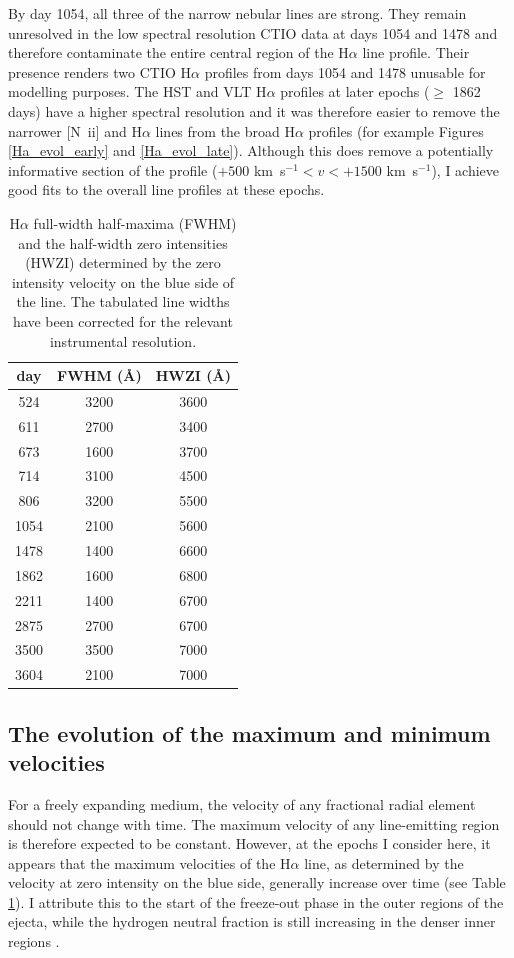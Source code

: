  
By day 1054, all three of the narrow nebular lines are strong.  They 
remain unresolved in the low spectral resolution CTIO data at days 1054 
and 1478 and therefore contaminate the entire central region of the 
H$\alpha$ line profile.  Their presence renders two CTIO H$\alpha$ 
profiles from days 1054 and 1478 unusable for modelling purposes.  The HST 
and VLT H$\alpha$ profiles at later epochs ($\ge$ 1862 days) have a higher 
spectral resolution and it was therefore easier to remove the narrower 
[N~{\sc ii}] and H$\alpha$ lines from the broad H$\alpha$ profiles (for 
example Figures \ref{Ha_evol_early} and \ref{Ha_evol_late}). Although this 
does remove a potentially informative section of the profile ($+500$ 
km~s$^{-1}<v<+1500$ km~s$^{-1}$), I achieve good fits to the overall line 
profiles at these epochs.

\begin{table}
\centering
\caption{H$\alpha$ full-width half-maxima (FWHM) and the half-width zero 
intensities (HWZI) determined by the zero intensity velocity on the 
blue side of the line.  The tabulated line widths have been corrected for the relevant instrumental resolution.}
\begin{tabular}{c cc}
day & FWHM (\AA) & HWZI (\AA) \\
\hline
524 & 3200 & 3600 \\
611 & 2700 & 3400 \\
673 & 1600 & 3700 \\
714 & 3100 & 4500 \\
806 & 3200 & 5500 \\
1054 & 2100 & 5600 \\
1478 & 1400 & 6600 \\
1862 & 1600 & 6800 \\
2211 & 1400 & 6700 \\
2875 & 2700 & 6700 \\
3500 & 3500 & 7000 \\
3604 & 2100 & 7000

\end{tabular}

\label{FWHM}
\end{table}%

\subsection{The evolution of the maximum and minimum velocities}

For a freely expanding medium, the velocity of any fractional radial 
element should not change with time.  The maximum velocity of any 
line-emitting region is therefore expected to be constant.  However, at 
the epochs I consider here, it appears that the maximum velocities of the 
H$\alpha$ line, as determined by the velocity at zero intensity on the 
blue side, generally increase over time (see Table \ref{FWHM}).  I 
attribute this to the start of the freeze-out phase in the outer regions 
of the ejecta, while the hydrogen neutral fraction is still increasing in 
the denser inner regions \citep{Danziger1991,Fransson1993}.

